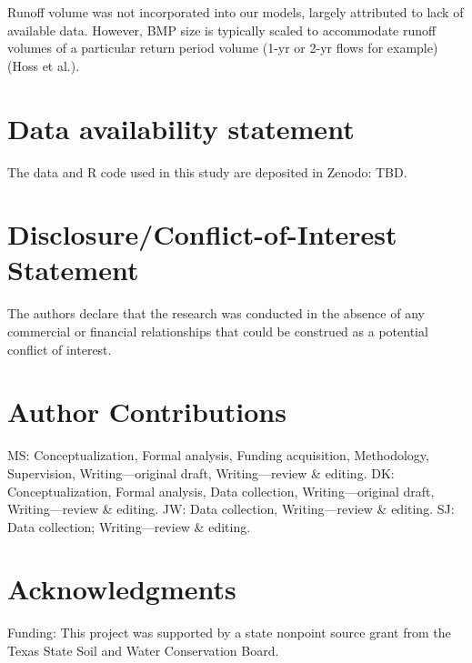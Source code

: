 \documentclass[utf8]{FrontiersinHarvard}
\begin{document}
Runoff volume was not incorporated into our models, largely attributed
to lack of available data. However, BMP size is typically scaled to
accommodate runoff volumes of a particular return period volume (1-yr or
2-yr flows for example) (Hoss et al.).

\hypertarget{data-availability-statement}{%
\section*{Data availability
statement}\label{data-availability-statement}}

The data and R code used in this study are deposited in Zenodo: TBD.

\hypertarget{disclosureconflict-of-interest-statement}{%
\section*{Disclosure/Conflict-of-Interest
Statement}\label{disclosureconflict-of-interest-statement}}

The authors declare that the research was conducted in the absence of
any commercial or financial relationships that could be construed as a
potential conflict of interest.

\hypertarget{author-contributions}{%
\section*{Author Contributions}\label{author-contributions}}

MS: Conceptualization, Formal analysis, Funding acquisition,
Methodology, Supervision, Writing---original draft, Writing---review \&
editing. DK: Conceptualization, Formal analysis, Data collection,
Writing---original draft, Writing---review \& editing. JW: Data
collection, Writing---review \& editing. SJ: Data collection;
Writing---review \& editing.

\hypertarget{acknowledgments}{%
\section*{Acknowledgments}\label{acknowledgments}}

Funding: This project was supported by a state nonpoint source grant
from the Texas State Soil and Water Conservation Board.
\end{document}
